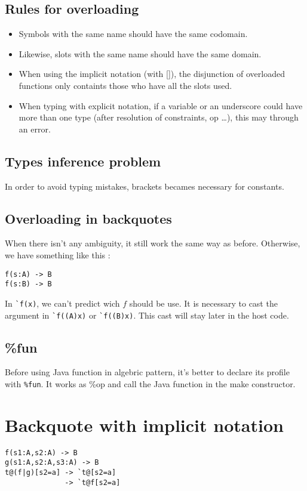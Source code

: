 \documentclass{article}
\begin{document}
\subsection{Rules for overloading}
\begin{itemize}
\item Symbols with the same name should have the same codomain.
\item Likewise, slots with the same name should have the same domain.
\item When using the implicit notation (with []), the disjunction of overloaded functions only containts those who have all the slots used.
\item When typing with explicit notation, if a variable or an underscore could have more than one type (after resolution of constraints, op \dots), this may through an error.
\end{itemize}
\subsection{Types inference problem}
In order to avoid typing mistakes, brackets becames necessary for constants.
\subsection{Overloading in backquotes}
When there isn't any ambiguity, it still work the same way as before.
Otherwise, we have something like this :
\begin{verbatim}
f(s:A) -> B
f(s:B) -> B
\end{verbatim}
In \verb$`f(x)$, we can't predict wich $f$ should be use. It is necessary to cast the argument in \verb$`f((A)x)$ or \verb$`f((B)x)$. This cast will stay later in the host code.
\subsection{\%fun}
Before using Java function in algebric pattern, it's better to declare its profile with \verb$%fun$. It works as \%op and call the Java function in the make constructor.

\section{Backquote with implicit notation}
\begin{verbatim}
f(s1:A,s2:A) -> B
g(s1:A,s2:A,s3:A) -> B
t@(f|g)[s2=a] -> `t@[s2=a]
              -> `t@f[s2=a]
\end{verbatim}
\end{document}
